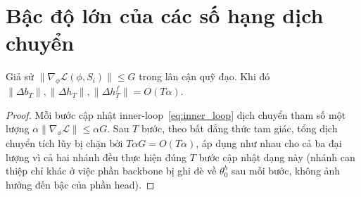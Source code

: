 \section{Bậc độ lớn của các số hạng dịch chuyển}

\begin{lemma}
\label{lem:displacement_order}
Giả sử $\|\nabla_\phi \mathcal{L}(\phi,S_i)\| \le G$ trong lân cận quỹ đạo. Khi đó $\|\Delta b_T\|, \|\Delta h_T\|, \|\Delta h_T^f\| = O(T\alpha)$.
\end{lemma}
\begin{proof}
Mỗi bước cập nhật inner-loop~\eqref{eq:inner_loop} dịch chuyển tham số một lượng $\alpha\|\nabla_\phi\mathcal{L}\| \le \alpha G$. Sau $T$ bước, theo bất đẳng thức tam giác, tổng dịch chuyển tích lũy bị chặn bởi $T\alpha G = O(T\alpha)$, áp dụng như nhau cho cả ba đại lượng vì cả hai nhánh đều thực hiện đúng $T$ bước cập nhật dạng này (nhánh can thiệp chỉ khác ở việc phần backbone bị ghi đè về $\theta_0^b$ sau mỗi bước, không ảnh hưởng đến bậc của phần head).
\end{proof}

